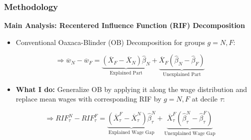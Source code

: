 \documentclass[10pt]{beamer}
\begin{document}
\begin{frame} 
	\frametitle{Methodology}
	
	\textbf{Main Analysis: Recentered Influence Function (RIF) Decomposition}
	
	
	\begin{itemize}
		\item Conventional Oaxaca-Blinder (OB) Decomposition for groups $g=N, F$:   
	\end{itemize}
	
	\begin{equation} \label{ob_decomp}
	\Longrightarrow	\overline{w}_N - \overline{w}_F =  \underbrace{(\overline{X}_F - \overline{X}_N) \hat{\beta}_N}_\text{Explained Part} + \underbrace{\overline{X}_F(\hat{\beta}_N - \hat{\beta}_F)}_\text{Unexplained Part}
	\end{equation} 
	
	\bigskip
	
	\begin{itemize}
		\item \textbf{What I do:} Generalize OB by applying it along the wage distribution and replace mean wages with corresponding RIF by $g=N, F$ at decile $\tau$:
	\end{itemize}
	
	\begin{equation} \label{rif_decomp}
	\Longrightarrow 	RIF_{\tau}^{N} - RIF_{\tau}^{F} =  \underbrace{(\overline{X}_{\tau}^{F} - \overline{X}_{\tau}^{N}) \hat{\beta}_{\tau}^{N}}_\text{Explained Wage Gap} + \underbrace{\overline{X}_{\tau}^{F}(\hat{\beta}_{\tau}^{N} - \hat{\beta}_{\tau}^{F})}_\text{Unexplained Wage Gap}
	\end{equation} 
	
	
	
	
\end{frame}

\end{document}
